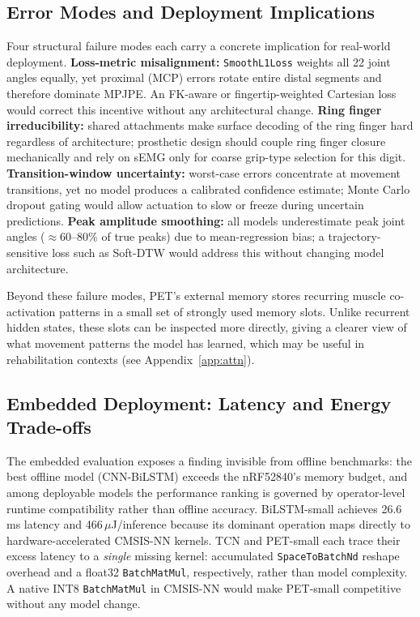 \documentclass[11pt]{article}
\begin{document}
\subsection{Error Modes and Deployment Implications}
\label{sec:disc_failures}

Four structural failure modes each carry a concrete implication for real-world deployment. \textbf{Loss-metric misalignment:} \texttt{SmoothL1Loss} weights all 22 joint angles equally, yet proximal (MCP) errors rotate entire distal segments and therefore dominate MPJPE. An FK-aware or fingertip-weighted Cartesian loss would correct this incentive without any architectural change. \textbf{Ring finger irreducibility:} shared attachments make surface decoding of the ring finger hard regardless of architecture; prosthetic design should couple ring finger closure mechanically and rely on sEMG only for coarse grip-type selection for this digit. \textbf{Transition-window uncertainty:} worst-case errors concentrate at movement transitions, yet no model produces a calibrated confidence estimate; Monte Carlo dropout gating would allow actuation to slow or freeze during uncertain predictions. \textbf{Peak amplitude smoothing:} all models underestimate peak joint angles (${\approx}$60--80\% of true peaks) due to mean-regression bias; a trajectory-sensitive loss such as Soft-DTW would address this without changing model architecture.

Beyond these failure modes, PET’s external memory stores recurring muscle co-activation patterns in a small set of strongly used memory slots. Unlike recurrent hidden states, these slots can be inspected more directly, giving a clearer view of what movement patterns the model has learned, which may be useful in rehabilitation contexts (see Appendix~\ref{app:attn}).

\subsection{Embedded Deployment: Latency and Energy Trade-offs}
\label{sec:disc_embedded}

The embedded evaluation exposes a finding invisible from offline benchmarks: the best offline model (CNN-BiLSTM) exceeds the nRF52840's memory budget, and among deployable models the performance ranking is governed by operator-level runtime compatibility rather than offline accuracy. BiLSTM-small achieves 26.6\,ms latency and 466\,$\mu$J/inference because its dominant operation maps directly to hardware-accelerated CMSIS-NN kernels. TCN and PET-small each trace their excess latency to a \emph{single} missing kernel: accumulated \texttt{SpaceToBatchNd} reshape overhead and a float32 
\texttt{BatchMatMul}, respectively, rather than model complexity. A native INT8 \texttt{BatchMatMul} in CMSIS-NN would make PET-small competitive without any model change.
\end{document}
